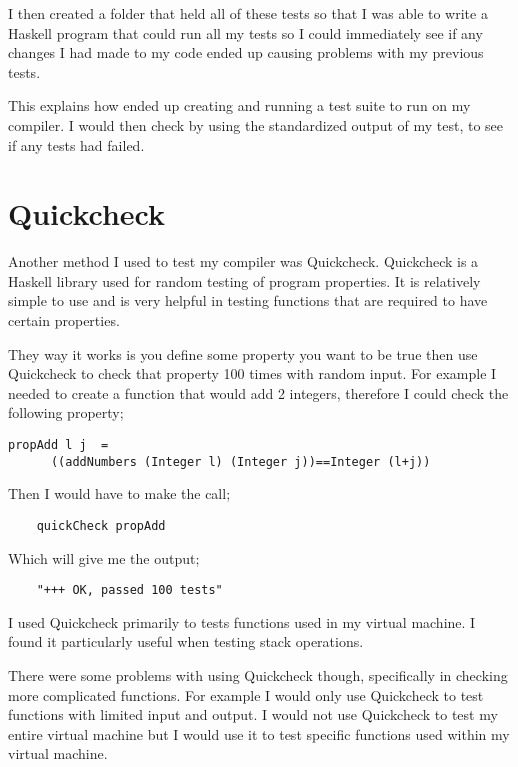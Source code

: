 I then created a folder that held all of these tests so that I was able to write a Haskell program that could run all my tests so I could immediately see if any changes I had made to my code ended up causing problems with my previous tests.

This explains how ended up creating and running a test suite to run on my compiler. I would then check by using the standardized output of my test, to see if any tests had failed.


\section{Quickcheck}

Another method I used to test my compiler was Quickcheck. Quickcheck is a Haskell library used for random testing of program properties\footnotemark[1]. It is relatively simple to use and is very helpful in testing functions that are required to have certain properties.


They way it works is you define some property you want to be true then use Quickcheck to check that property 100 times with random input. For example I needed to create a function that would add 2 integers, therefore I could check the following property;

\begin{lstlisting}
propAdd l j  = 
      ((addNumbers (Integer l) (Integer j))==Integer (l+j))
\end{lstlisting} 

Then I would have to make the call;

\begin{lstlisting}
	quickCheck propAdd
\end{lstlisting}
 
Which will give me the output;

\begin{lstlisting}
	"+++ OK, passed 100 tests" 
\end{lstlisting}

I used Quickcheck primarily to tests functions used in my virtual machine. I found it particularly useful when testing stack operations.  

There were some problems with using Quickcheck though, specifically in checking more complicated functions. For example I would only use Quickcheck to test functions with limited input and output. I would not use Quickcheck to test my entire virtual machine but I would use it to test specific functions used within my virtual machine.

